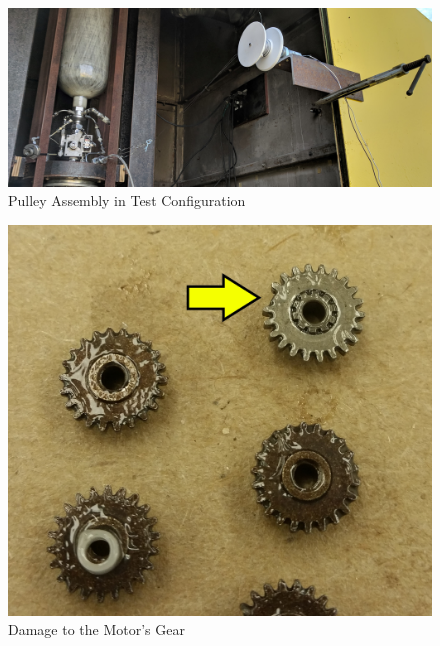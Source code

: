 \documentclass[10pt,a4paper]{article}
\begin{document}
\begin{figure}[h!]
	\centering
	\includegraphics[width=1.0\textwidth]{./figs/qd_setup.jpg}
	\caption{Pulley Assembly in Test Configuration}
	\label{fig:qd_setup}
\end{figure}

\begin{figure}[h!]
	\centering
	\includegraphics[width=.5\textwidth]{./figs/qd_gear.jpg}
	\caption{Damage to the Motor's Gear}
	\label{fig:qd_gear}
\end{figure}
\end{document}

